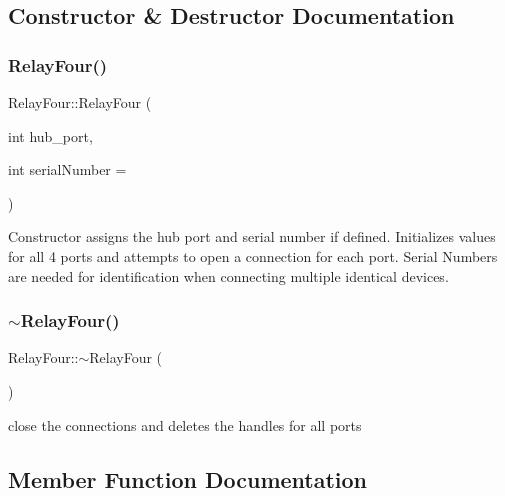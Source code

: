 \subsection{Constructor \& Destructor Documentation}
\mbox{\label{classRelayFour_a2ddfd3e80919ee0b87ddde0a9608cec1}} 
\subsubsection{\texorpdfstring{Relay\+Four()}{RelayFour()}}
{\footnotesize\ttfamily Relay\+Four\+::\+Relay\+Four (\begin{DoxyParamCaption}\item[{int}]{hub\+\_\+port,  }\item[{int}]{serial\+Number = {} }\end{DoxyParamCaption})\hspace{0.3cm}{\ttfamily [inline]}}

Constructor assigns the hub port and serial number if defined. Initializes values for all 4 ports and attempts to open a connection for each port. Serial Numbers are needed for identification when connecting multiple identical devices.\mbox{\label{classRelayFour_ad3577f6c353abbbdb308cc52a1adffeb}} 
\subsubsection{\texorpdfstring{$\sim$\+Relay\+Four()}{~RelayFour()}}
{\footnotesize\ttfamily Relay\+Four\+::$\sim$\+Relay\+Four (\begin{DoxyParamCaption}{ }\end{DoxyParamCaption})\hspace{0.3cm}{\ttfamily [inline]}}

close the connections and deletes the handles for all ports

\subsection{Member Function Documentation}
\mbox{\label{classRelayFour_a64b6ba9a4ac452abe46d3fe03896c965}} 
